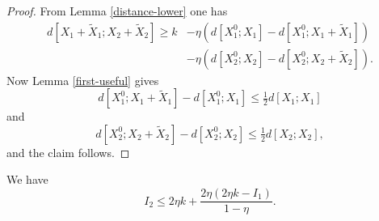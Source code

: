 \begin{proof} From Lemma \ref{distance-lower} one has
\begin{align*}
    d[X_1+\tilde X_1; X_2+\tilde X_2] \geq k &- \eta(d[X^0_1;X_1] - d[X^0_1;X_1+\tilde X_1]) \\
    &- \eta(d[X^0_2;X_2] - d[X^0_2;X_2+\tilde X_2]).
\end{align*}
Now Lemma \ref{first-useful} gives
$$
d[X^0_1;X_1+\tilde X_1] - d[X^0_1;X_1] \leq \tfrac{1}{2} d[X_1;X_1]$$
and
$$
  d[X^0_2;X_2+\tilde X_2] - d[X^0_2;X_2] \leq \tfrac{1}{2} d[X_2;X_2],
$$
and the claim follows.
\end{proof}

\begin{lemma}\label{second-estimate}
  \leanok
We have
$$ I_2 \leq 2 \eta k + \frac{2 \eta (2 \eta k - I_1)}{1 - \eta}.$$
\end{lemma}

